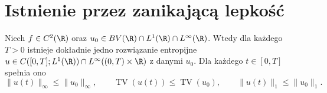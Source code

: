 \section{Istnienie przez zanikającą lepkość}
\begin{twierdzenie}
\label{thm:pde24-existence}
Niech $f\in C^2(\R)$ oraz
$u_0\in BV(\R)\cap L^1(\R)\cap L^\infty(\R)$.
Wtedy dla każdego $T>0$ istnieje dokładnie jedno
rozwiązanie entropijne $u\in C([0,T];L^1(\R))\cap L^\infty((0,T)\times\R)$
z danymi $u_0$. Dla każdego $t\in[0,T]$ spełnia ono
\begin{equation}\label{eq:pde24-BVbound}
 \|u(t)\|_\infty\le\|u_0\|_\infty,
 \qquad \operatorname{TV}(u(t))\le\operatorname{TV}(u_0),
 \qquad \|u(t)\|_1\le\|u_0\|_1.
\end{equation}
\end{twierdzenie}
